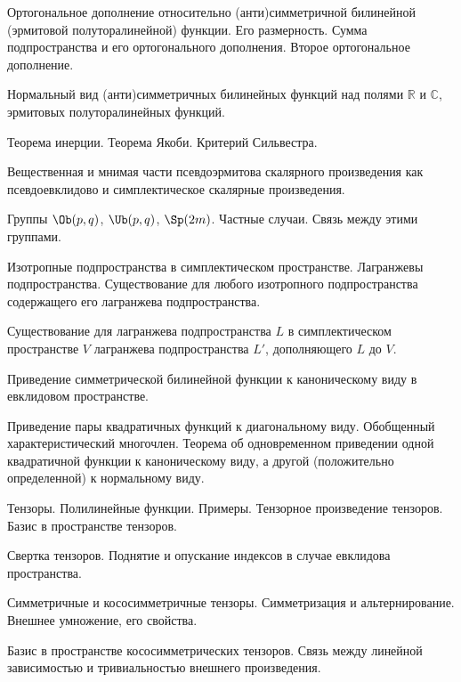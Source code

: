 \documentclass[a4paper]{article}
\begin{document}
\begin{nums}{-2}
\item  Ортогональное    дополнение    относительно
(анти)симметричной билинейной (эрмитовой полуторалинейной)
функции. Его размерность. Сумма подпространства и его
ортогонального дополнения. Второе ортогональное дополнение.

\item Нормальный вид (анти)симметричных билинейных функций над
полями $\mathbb{R}$ и $\mathbb{C}$, эрмитовых полуторалинейных
функций.

\item  Теорема инерции. Теорема Якоби. Критерий Сильвестра.

\item  Вещественная и мнимая части псевдоэрмитова скалярного
произведения как псевдоевклидово и симплектическое  скалярные
произведения.

\item  Группы $\Ob(p,q)$, $\Ub(p, q)$, $\Sp(2m)$. Частные случаи. Связь
между этими группами.

\item Изотропные подпространства в симплектическом пространстве.
Лагранжевы подпространства. Существование   для   любого
изотропного   подпространства   содержащего   его   лагранжева
подпространства.

\item  Существование   для   лагранжева подпространства   $L$  в
симплектическом   пространстве   $V$ лагранжева подпространства
$L'$, дополняющего $L$ до $V$.

\item Приведение   симметрической   билинейной   функции   к
каноническому   виду   в   евклидовом пространстве.

\item Приведение     пары     квадратичных     функций     к
диагональному     виду.      Обобщенный характеристический
многочлен. Теорема об одновременном приведении одной квадратичной
функции к каноническому виду, а другой (положительно определенной)\т
к нормальному виду.

\item  Тензоры.   Полилинейные  функции. Примеры.   Тензорное
произведение  тензоров.   Базис  в пространстве тензоров.

\item   Свертка тензоров. Поднятие и опускание индексов в случае
евклидова пространства.

\item Симметричные и кососимметричные тензоры. Симметризация и
альтернирование. Внешнее умножение, его свойства.

\item  Базис в пространстве кососимметрических тензоров. Связь между
линейной зависимостью и тривиальностью внешнего произведения.
\end{nums}

\medskip\dmvntrail
\end{document}
